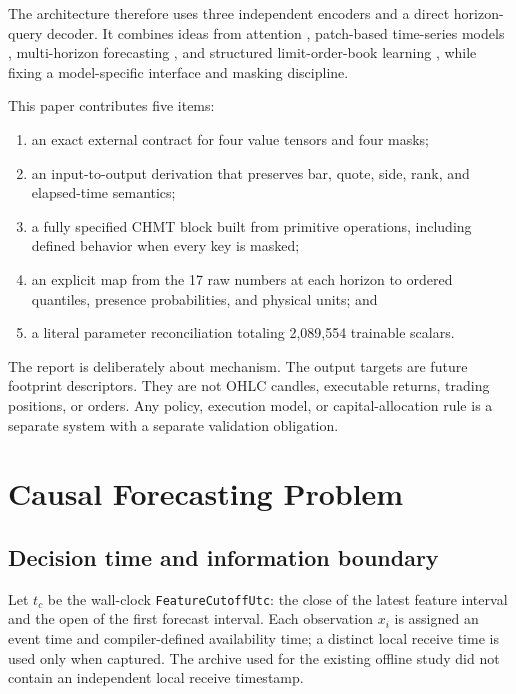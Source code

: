 \documentclass[10pt,letterpaper]{article}
\numberwithin{equation}{section}
\theoremstyle{definition}
\theoremstyle{remark}
\begin{document}
The architecture therefore uses three independent encoders and a direct
horizon-query decoder. It combines ideas from attention
\citep{vaswani2017,shaw2018}, patch-based time-series models
\citep{nie2023}, multi-horizon forecasting \citep{lim2021}, and structured
limit-order-book learning
\citep{deepLOB2019,wallbridge2020,zhang2021lob,ntakaris2018,kolm2023}, while
fixing a model-specific interface and masking discipline.

This paper contributes five items:
\begin{enumerate}
  \item an exact external contract for four value tensors and four masks;
  \item an input-to-output derivation that preserves bar, quote, side, rank,
  and elapsed-time semantics;
  \item a fully specified CHMT block built from primitive operations, including
  defined behavior when every key is masked;
  \item an explicit map from the 17 raw numbers at each horizon to ordered
  quantiles, presence probabilities, and physical units; and
  \item a literal parameter reconciliation totaling 2,089,554 trainable
  scalars.
\end{enumerate}

The report is deliberately about mechanism. The output targets are future
footprint descriptors. They are not OHLC candles, executable returns, trading
positions, or orders. Any policy, execution model, or capital-allocation rule
is a separate system with a separate validation obligation.

\section{Causal Forecasting Problem}

\subsection{Decision time and information boundary}

Let \(t_c\) be the wall-clock \texttt{FeatureCutoffUtc}: the close of the
latest feature interval and the open of the first forecast interval. Each
observation \(x_i\) is assigned an event time and compiler-defined availability
time; a distinct local receive time is used only when captured. The archive
used for the existing offline study did not contain an independent local
receive timestamp.
\end{document}
